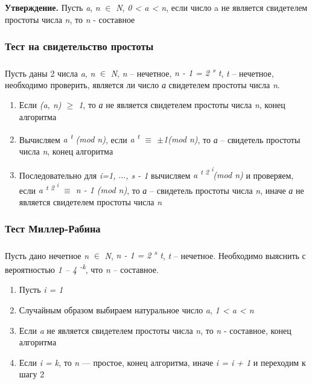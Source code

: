   \textbf{Утверждение.} Пусть \textit{a}, \textit{n} {$\in$} \textit{N}, \textit{0 < a < n}, если число a не является свидетелем 
простоты числа \textit{n}, то \textit{n} - составное

\subsubsection{Тест на свидетельство простоты}

\paragraph{}Пусть даны 2 числа \textit{a}, \textit{n} {$\in$} \textit{N}, \textit{n} – нечетное, \textit{n - 1 = 2\textsuperscript{ s} t}, 
\textit{t} – нечетное, необходимо проверить, является ли число \textit{а} свидетелем простоты числа \textit{n}.

  \begin{enumerate}
   \item Если \textit{(a, n) {$\ge$} 1}, то \textit{а} не является свидетелем простоты числа \textit{n}, конец алгоритма
   \item Вычисляем \textit{a\textsuperscript{ t} (mod n)}, если \textit{a\textsuperscript{ t} {$\equiv$} {$\pm$}1(mod n)}, то \textit{а}
– свидетель простоты числа \textit{n}, конец алгоритма
   \item Последовательно для \textit{i=1, {$\dots$}, s - 1} вычисляем \textit{a\textsuperscript{ t 2\textsuperscript{ i}}(mod n)} и 
проверяем, если \textit{a\textsuperscript{ t 2\textsuperscript{ i}} {$\equiv$} n - 1 (mod n)}, то \textit{а} – 
свидетель простоты числа \textit{n}, иначе \textit{а} не является свидетелем простоты числа \textit{n}
  \end{enumerate}


\subsubsection{Тест Миллер-Рабина}

\paragraph{}Пусть дано нечетное \textit{n} {$\in$} \textit{N}, \textit{n - 1 = 2\textsuperscript{ s} t}, \textit{t} – нечетное. Необходимо выяснить 
с вероятностью \textit{1 – 4\textsuperscript{ -k}}, что \textit{n} – составное.
  
  \begin{enumerate}
   \item Пусть \textit{i = 1}
   \item Случайным образом выбираем натуральное число \textit{a}, \textit{1 < a < n}
   \item Если \textit{a} не является свидетелем простоты числа \textit{n}, то \textit{n} - составное, конец алгоритма
   \item Если \textit{i = k}, то \textit{n} — простое, конец алгоритма, иначе \textit{i = i + 1} и переходим к шагу 2
  \end{enumerate}

